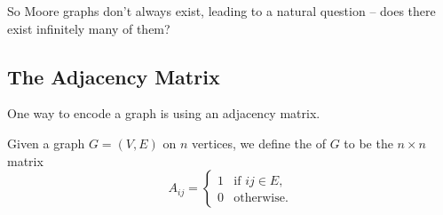 \documentclass[a4paper]{scrartcl}
\begin{document}
So Moore graphs don't always exist, leading to a natural question -- does there exist infinitely many of them?


\subsection{The Adjacency Matrix}

One way to encode a graph is using an adjacency matrix.

\begin{definition}
	Given a graph $G = (V, E)$ on $n$ vertices, we define the  of $G$ to be the $n \times n$ matrix
	$$
	A_{ij} = \begin{cases}
		1 &\mbox{if } ij \in E, \\
		0 &\mbox{otherwise}.
	   \end{cases}
	$$
\end{definition}
\end{document}
